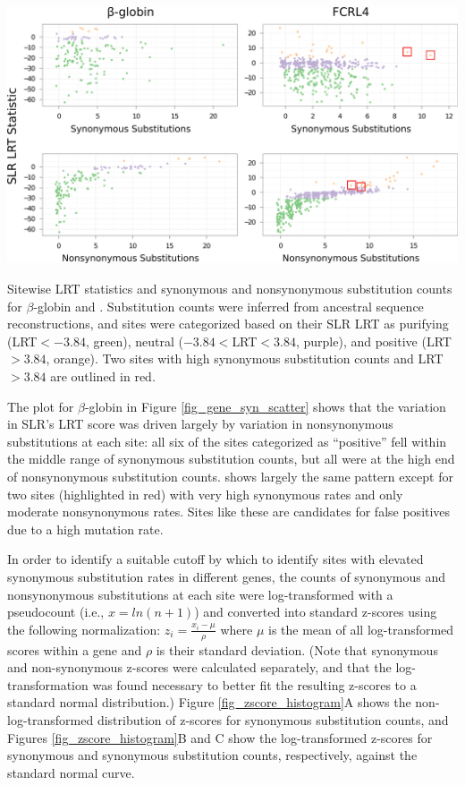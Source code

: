 \bbfig
\centering
\includegraphics[scale=0.5]{Figs/gene_syn_scatter.pdf}
\caption{Sitewise LRT statistics and synonymous and nonsynonymous
  substitution counts for $\beta$-globin and
  . Substitution counts were inferred from ancestral
  sequence reconstructions, and sites were categorized based on their
  SLR LRT as purifying (LRT$<-3.84$, green), neutral
  ($-3.84<$LRT$<3.84$, purple), and positive (LRT$>3.84$, orange). Two
  sites with high synonymous substitution counts and LRT$>3.84$ are
  outlined in red. }
\label{fig_gene_syn_scatter}
\eefig

The plot for $\beta$-globin in Figure \ref{fig_gene_syn_scatter} shows
that the variation in SLR's LRT score was driven largely by variation
in nonsynonymous substitutions at each site: all six of the sites
categorized as ``positive'' fell within the middle range of synonymous
substitution counts, but all were at the high end of nonsynonymous
substitution counts.  shows largely the same pattern
except for two sites (highlighted in red) with very high synonymous
rates and only moderate nonsynonymous rates. Sites like these are
candidates for false positives due to a high mutation rate.

In order to identify a suitable cutoff by which to identify sites with
elevated synonymous substitution rates in different genes, the counts
of synonymous and nonsynonymous substitutions at each site were
log-transformed with a pseudocount (i.e., $x = ln(n + 1)$) and
converted into standard z-scores using the following normalization:
$z_{i} = \frac{x_{i} - \mu}{\rho}$ where $\mu$ is the mean of all
log-transformed scores within a gene and $\rho$ is their standard
deviation. (Note that synonymous and non-synonymous z-scores were
calculated separately, and that the log-transformation was found
necessary to better fit the resulting z-scores to a standard normal
distribution.) Figure \ref{fig_zscore_histogram}A shows the
non-log-transformed distribution of z-scores for synonymous
substitution counts, and Figures \ref{fig_zscore_histogram}B and C
show the log-transformed z-scores for synonymous and synonymous
substitution counts, respectively, against the standard normal curve.

